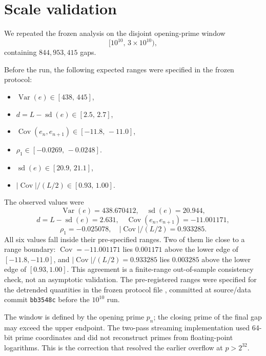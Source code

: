 \section{Scale validation}

We repeated the frozen analysis on the disjoint opening-prime window
\[
[10^{10},\,3\times 10^{10}),
\]
containing $844{,}953{,}415$ gaps.

Before the run, the following expected ranges were specified in the frozen protocol:

\begin{itemize}
\item $\operatorname{Var}(e)\in[438,\,445]$,
\item $d = L-\operatorname{sd}(e)\in[2.5,\,2.7]$,
\item $\operatorname{Cov}(e_n,e_{n+1})\in[-11.8,\,-11.0]$,
\item $\rho_1\in[-0.0269,\,-0.0248]$.
\item $\operatorname{sd}(e)\in[20.9,\,21.1]$,
\item $|\operatorname{Cov}|/(L/2)\in[0.93,\,1.00]$.
\end{itemize}

The observed values were
\[
\operatorname{Var}(e) = 438.670412,\quad
\operatorname{sd}(e) = 20.944,
\]
\[
d = L-\operatorname{sd}(e) = 2.631,\quad
\operatorname{Cov}(e_n,e_{n+1}) = -11.001171,
\]
\[
\rho_1 = -0.025078,\quad
|\operatorname{Cov}|/(L/2) = 0.933285.
\]
All six values fall inside their pre-specified ranges. Two of them lie close to a range boundary: $\operatorname{Cov} = -11.001171$ lies $0.001171$ above the lower edge of $[-11.8, -11.0]$, and $|\operatorname{Cov}|/(L/2) = 0.933285$ lies $0.003285$ above the lower edge of $[0.93, 1.00]$. This agreement is a finite-range out-of-sample consistency check, not an asymptotic validation. The pre-registered ranges were specified for the detrended quantities in the frozen protocol file , committed at source/data commit \texttt{bb3548c} before the $10^{10}$ run.

The window is defined by the opening prime $p_n$; the closing prime of the final gap may exceed the upper endpoint. The two-pass streaming implementation used 64-bit prime coordinates and did not reconstruct primes from floating-point logarithms. This is the correction that resolved the earlier overflow at $p > 2^{32}$.
